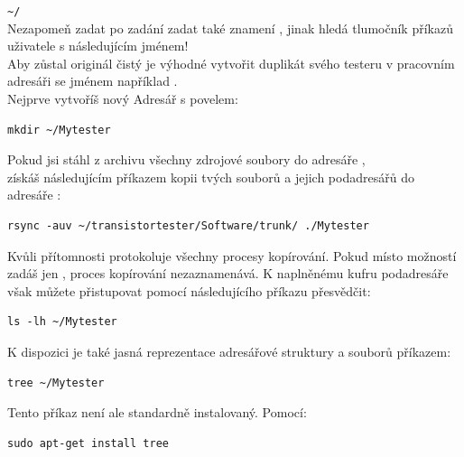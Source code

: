 \verb"~/"\\
Nezapomeň zadat po zadání \lname{\textasciitilde} zadat také znamení \lname{/} , jinak hledá tlumočník příkazů uživatele s následujícím jménem!\\   
Aby zůstal originál čistý je výhodné vytvořit duplikát svého testeru v pracovním adresáři se jménem například .\\
Nejprve vytvoříš nový Adresář s povelem:
\begin{large} \vspace{-0.4em} \begin{verbatim}
mkdir ~/Mytester
\end{verbatim} \end{large}

Pokud jsi stáhl z  archivu všechny zdrojové soubory do adresáře ,\\
získáš následujícím příkazem kopii tvých souborů a jejich podadresářů do adresáře : 
\begin{large} \vspace{-0.4em} \begin{verbatim}
rsync -auv ~/transistortester/Software/trunk/ ./Mytester
\end{verbatim} \end{large}

Kvůli přítomnosti  protokoluje  všechny procesy kopírování.
Pokud místo možností  zadáš jen , proces kopírování nezaznamenává.
K naplněnému kufru podadresáře však můžete přistupovat pomocí následujícího příkazu
přesvědčit: 
\begin{large} \vspace{-0.4em} \begin{verbatim}
ls -lh ~/Mytester
\end{verbatim} \end{large}

K dispozici je také jasná reprezentace adresářové struktury a souborů příkazem:
\begin{large} \vspace{-0.4em} \begin{verbatim}
tree ~/Mytester
\end{verbatim} \end{large}

Tento příkaz není ale standardně instalovaný. Pomocí:
\begin{large} \vspace{-0.4em} \begin{verbatim}
sudo apt-get install tree
\end{verbatim} \end{large}

